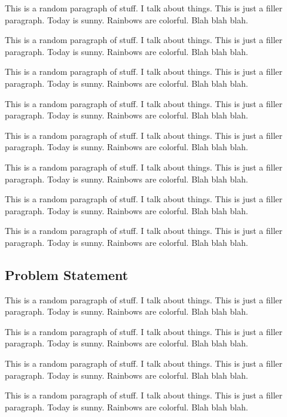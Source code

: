 \documentclass{article}
\begin{document}
		{\color{BurntOrange} This is a random paragraph of stuff. I talk about things. This is just a filler paragraph. Today is sunny. Rainbows are colorful. Blah blah blah.}
		
		{\color{BurntOrange} This is a random paragraph of stuff. I talk about things. This is just a filler paragraph. Today is sunny. Rainbows are colorful. Blah blah blah.}
		
		{\color{BurntOrange} This is a random paragraph of stuff. I talk about things. This is just a filler paragraph. Today is sunny. Rainbows are colorful. Blah blah blah.}
		
		{\color{BurntOrange} This is a random paragraph of stuff. I talk about things. This is just a filler paragraph. Today is sunny. Rainbows are colorful. Blah blah blah.}
		
		{\color{BurntOrange} This is a random paragraph of stuff. I talk about things. This is just a filler paragraph. Today is sunny. Rainbows are colorful. Blah blah blah.}
		
		{\color{BurntOrange} This is a random paragraph of stuff. I talk about things. This is just a filler paragraph. Today is sunny. Rainbows are colorful. Blah blah blah.}
		
		{\color{BurntOrange} This is a random paragraph of stuff. I talk about things. This is just a filler paragraph. Today is sunny. Rainbows are colorful. Blah blah blah.}
		
		{\color{BurntOrange} This is a random paragraph of stuff. I talk about things. This is just a filler paragraph. Today is sunny. Rainbows are colorful. Blah blah blah.}
		
	\subsection{Problem Statement}

		{\color{BurntOrange} This is a random paragraph of stuff. I talk about things. This is just a filler paragraph. Today is sunny. Rainbows are colorful. Blah blah blah.}
		
		{\color{BurntOrange} This is a random paragraph of stuff. I talk about things. This is just a filler paragraph. Today is sunny. Rainbows are colorful. Blah blah blah.}
		
		{\color{BurntOrange} This is a random paragraph of stuff. I talk about things. This is just a filler paragraph. Today is sunny. Rainbows are colorful. Blah blah blah.}
		
		{\color{BurntOrange} This is a random paragraph of stuff. I talk about things. This is just a filler paragraph. Today is sunny. Rainbows are colorful. Blah blah blah.}
		
\end{document}
